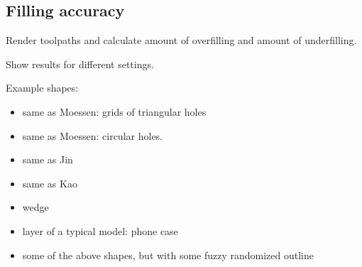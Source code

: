 \subsection{Filling accuracy}
Render toolpaths and calculate amount of overfilling and amount of underfilling.


Show results for different settings.


Example shapes:
\begin{itemize}
\item same as Moessen: grids of triangular holes
\item same as Moessen: circular holes.
\item same as Jin 
\item same as Kao
\item wedge
\item layer of a typical model: phone case
\item some of the above shapes, but with some fuzzy randomized outline
\end{itemize}



